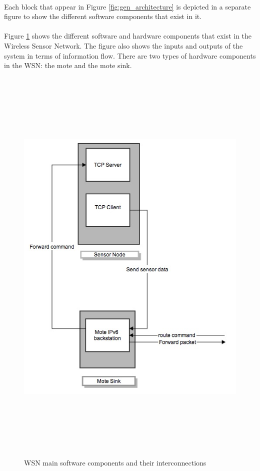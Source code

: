 \documentclass[12pt,a4paper,final]{report}
\begin{document}
\paragraph{}
Each block that appear in Figure \ref{fig:gen_architecture} is depicted in a separate figure to show the different software components that exist in it.
\paragraph{}
Figure \ref{fig:part1} shows the different software and hardware components that exist in the Wireless Sensor Network. The figure also shows the inputs and outputs of the system in terms of information flow. There are two types of hardware components in the WSN: the mote and the mote sink. 
\begin{figure}[htbp]
\centering
\includegraphics[width=12cm,height=20cm,keepaspectratio]{img/part1.jpg}
\caption{WSN main software components and their interconnections}
\label{fig:part1}
\end{figure}
\end{document}

